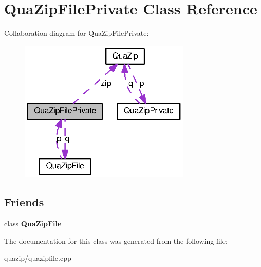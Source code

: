 \section{QuaZipFilePrivate Class Reference}
\label{classQuaZipFilePrivate}


Collaboration diagram for QuaZipFilePrivate:
\nopagebreak
\begin{figure}[H]
\begin{center}
\leavevmode
\includegraphics[width=231pt]{classQuaZipFilePrivate__coll__graph}
\end{center}
\end{figure}
\subsection*{Friends}
\begin{DoxyCompactItemize}
\item 
class {\bf QuaZipFile}\label{classQuaZipFilePrivate_a40bd4ccb6d2d00726e1de81329ebaa7a}

\end{DoxyCompactItemize}


The documentation for this class was generated from the following file:\begin{DoxyCompactItemize}
\item 
quazip/quazipfile.cpp\end{DoxyCompactItemize}
